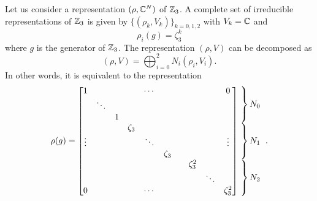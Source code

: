             Let us consider a representation $(\rho,\mathbb{C}^N)$ of $\mathbb{Z}_3$. A complete set of irreducible representations of $\mathbb{Z}_3$ is given by $\{(\rho_k,V_k)\}_{k=0,1,2}$ with $V_k=\mathbb{C}$ and
            \begin{equation}
                \rho_i(g)=\zeta^k_3
            \end{equation}
            where $g$ is the generator of $\mathbb{Z}_3$. The representation $(\rho,V)$ can be decomposed as
            \begin{equation}
                (\rho,V)=\bigoplus^{2}_{i=0}N_i(\rho_i,V_i).
            \end{equation}
            In other words, it is equivalent to the representation
            \begin{equation}
                \rho(g)=
                \begin{bmatrix}
                    1 & & & & \cdots & & & & & 0 \\
                    & \ddots & & & & & & & & \\
                    & & 1 & & & & & & & \\
                    & & & \zeta_3 & & & & & & \\
                    \vdots & & & & \ddots & & & & & \vdots \\
                    & & & & & \zeta_3 & & & & \\
                    & & & & & & & \zeta^2_3 & & \\
                    & & & & & & & & \ddots & \\
                    0 & & & & \cdots & & & & & \zeta^2_3 \\
                \end{bmatrix}
                \hspace{-0.2cm}
                \begin{tabular}{l}
                $\left.\lefteqn{\phantom{
                    \begin{matrix}
                        a_0\\ \ddots\\ a_0\ 
                    \end{matrix} 
                }}\right\}N_0$\\
                $\left.\lefteqn{\phantom{
                    \begin{matrix}
                        a_0\\ \ddots\\ a_0\ 
                    \end{matrix} 
                }}\right\}N_1$\\
                $\left.\lefteqn{\phantom{
                    \begin{matrix}
                        b_0\\ \ddots\\ b_0\ 
                    \end{matrix}
                }} \right\}N_2$
                \end{tabular}.\label{eq:reprrhoZn}
            \end{equation}
